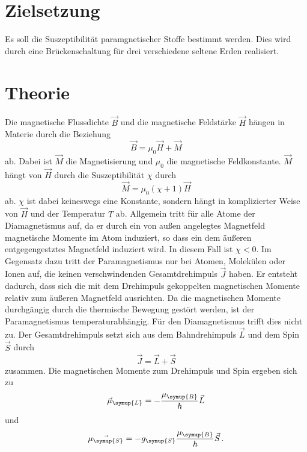 \section{Zielsetzung}
\label{sec:Zielsetzung}
Es soll die Suszeptibilität paramgnetischer Stoffe bestimmt werden. Dies wird durch eine Brückenschaltung für
drei verschiedene seltene Erden realisiert.

\section{Theorie}
\label{sec:Theorie}
Die magnetische Flussdichte $\vec{B}$ und die magnetische Feldstärke $\vec{H}$ hängen in Materie durch die
Beziehung
\begin{equation}
    \vec{B} = \mu_{0}\vec{H}+\vec{M}
\end{equation}
ab. Dabei ist $\vec{M}$ die Magnetisierung und $\mu_{0}$ die magnetische Feldkonstante. $\vec{M}$ hängt von
$\vec{H}$ durch die Suszeptibilität $\chi$ durch
\begin{equation}
    \vec{M} = \mu_{0}\left(\chi+1\right)\vec{H}
\end{equation}
ab. $\chi$ ist dabei keineswegs eine Konstante, sondern hängt in komplizierter Weise von $\vec{H}$ und der
Temperatur $T$ ab. Allgemein tritt für alle Atome der Diamagnetismus auf, da er durch ein von außen angelegtes
Magnetfeld magnetische Momente im Atom induziert, so dass ein dem äußeren entgegengestztes Magnetfeld induziert
wird. In diesem Fall ist $\chi < 0$. Im Gegensatz dazu tritt der Paramagnetismus nur bei Atomen, Molekülen oder
Ionen auf, die keinen verschwindenden Gesamtdrehimpuls $\vec{J}$ haben. Er entsteht dadurch, dass sich die mit
dem Drehimpuls gekoppelten magnetischen Momente relativ zum äußeren Magnetfeld ausrichten. Da die magnetischen
Momente durchgängig durch die thermische Bewegung gestört werden, ist der Paramagnetismus temperaturabhängig.
Für den Diamagnetismus trifft dies nicht zu. Der Gesamtdrehimpuls setzt sich aus dem Bahndrehimpuls $\vec{L}$
und dem Spin $\vec{S}$ durch
\begin{equation*}
    \vec{J} = \vec{L} + \vec{S}
\end{equation*}
zusammen. Die magnetischen Momente zum Drehimpuls und Spin ergeben sich zu
\begin{equation*}
    \vec{\mu}_{\symup{L}} = -\frac{\mu_{\symup{B}}}{\hbar} \vec{L}
\end{equation*}
und
\begin{equation*}
    \vec{\mu_{\symup{S}}} =  -g_{\symup{S}}\frac{\mu_{\symup{B}}}{\hbar}\vec{S}\,.
\end{equation*}
